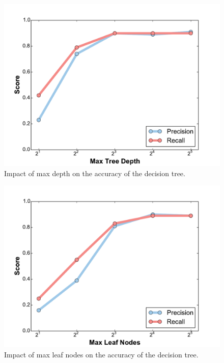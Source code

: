 \begin{figure}[h!]
    \centering
	\includegraphics[width=0.7\linewidth]{figure/depth.pdf}
	\caption{Impact of max depth on the accuracy of the decision tree.}
\end{figure}

\begin{figure}[h!]
    \centering
	\includegraphics[width=0.7\linewidth]{figure/leaves.pdf}
	\caption{Impact of max leaf nodes on the accuracy of the decision tree.}
\end{figure}

